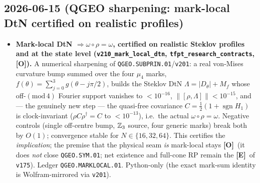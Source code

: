 \documentclass[11pt]{article}
\providecommand{\mE}{\textbf{[E]}}\providecommand{\mC}{\textbf{[C]}}
\providecommand{\mO}{\textbf{[O]}}\providecommand{\mX}{\textbf{[X]}}
\begin{document}
\subsection*{2026-06-15 (QGEO sharpening: mark-local DtN certified on realistic profiles)}
\begin{itemize}
\item \textbf{Mark-local DtN $\Rightarrow\omega\circ\rho=\omega$, certified on realistic Steklov profiles and
  at the state level (\texttt{v210\_mark\_local\_dtn}, \texttt{tfpt\_research\_contracts}, \mO).} A numerical
  sharpening of \texttt{QGEO.SUBPRIN.01}/\texttt{v201}: a real von-Mises curvature bump summed over the four
  $\mu_4$ marks, $f(\theta)=\sum_{j=0}^3 g(\theta-j\pi/2)$, builds the Steklov DtN $\Lambda=|D_\theta|+M_f$
  whose off-$(\mathrm{mod}\,4)$ Fourier support vanishes to $<10^{-16}$, $\|[\rho,\Lambda]\|<10^{-15}$, and ---
  the genuinely new step --- the quasi-free covariance $C=\tfrac12(1+\operatorname{sgn}H_1)$ is clock-invariant
  ($\rho C\rho^\dagger=C$ to $<10^{-13}$), i.e.\ the actual $\omega\circ\rho=\omega$. Negative controls (single
  off-centre bump, $\mathbb{Z}_3$ source, four generic marks) break both by $O(1)$; convergence stable for
  $N\in\{16,32,64\}$. This certifies the \emph{implication}; the premise that the physical seam \emph{is}
  mark-local stays \mO\ (it does \emph{not} close \texttt{QGEO.SYM.01}; net existence and full-cone RP remain
  the \mE\ of \texttt{v175}). Ledger \texttt{QGEO.MARKLOCAL.01}. Python-only (the exact mark-sum identity is
  Wolfram-mirrored via \texttt{v201}).
\end{itemize}
\end{document}
